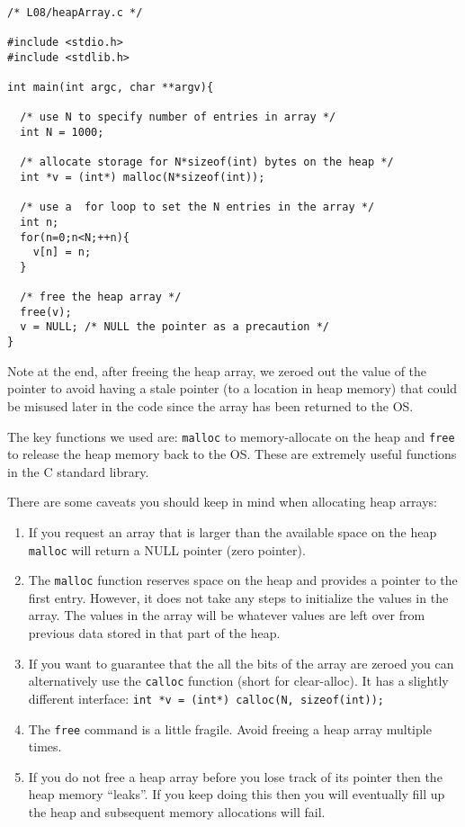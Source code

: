 \begin{verbatim}

/* L08/heapArray.c */

#include <stdio.h>
#include <stdlib.h>

int main(int argc, char **argv){
 
  /* use N to specify number of entries in array */
  int N = 1000;
  
  /* allocate storage for N*sizeof(int) bytes on the heap */
  int *v = (int*) malloc(N*sizeof(int));
  
  /* use a  for loop to set the N entries in the array */
  int n;
  for(n=0;n<N;++n){
    v[n] = n;
  }
  
  /* free the heap array */
  free(v);
  v = NULL; /* NULL the pointer as a precaution */ 
}
\end{verbatim}

Note at the end, after freeing the heap array, we zeroed out the value of the pointer to avoid having a stale pointer (to a location in heap memory) that could be misused later in the code since the array has been returned to the OS.

The key functions we used are: \texttt{malloc} to memory-allocate on the heap and \texttt{free} to release the heap memory back to the OS. These are extremely useful functions in the C standard library. 

There are some caveats you should keep in mind when allocating heap arrays:
\begin{enumerate}
    \item If you request an array that is larger than the available space on the heap \texttt{malloc} will return a NULL pointer (zero pointer).
    \item The \texttt{malloc} function reserves space on the heap and provides a pointer to the first entry. However, it does not take any steps to initialize the values in the array. The values in the array will be whatever values are left over from previous data stored in that part of the heap.
    \item If you want to guarantee that the all the bits of the array are zeroed you can alternatively use the \texttt{calloc} function (short for clear-alloc). It has a slightly different interface: \texttt{int *v = (int*) calloc(N, sizeof(int));}
    \item The \texttt{free} command is a little fragile. Avoid freeing a heap array multiple times.
    \item If you do not free a heap array before you lose track of its pointer then the heap memory ``leaks''. If you keep doing this then you will eventually fill up the heap and subsequent memory allocations will fail.
\end{enumerate}

